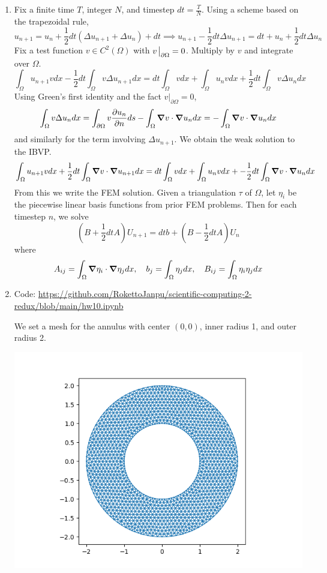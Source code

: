 \documentclass{article}
\newcommand{\br}[1]{\left(#1\right)}
\newcommand{\imp}{\implies}
\newcommand{\ptl}{\partial}
\begin{document}
\begin{enumerate}
\begin{enumerate}
	
	\item Fix a finite time $T$, integer $N$, and timestep $dt=\frac TN$. Using a scheme based on the trapezoidal rule,
	$$u_{n+1} = u_n + \frac12dt(\Delta u_{n+1}+\Delta u_n) + dt
	\imp u_{n+1} - \frac12dt\Delta u_{n+1} = dt + u_n + \frac12dt\Delta u_n$$
	Fix a test function $v\in C^2(\Omega)$ with $v\eval_{\ptl\Omega}=0$. Multiply by $v$ and integrate over $\Omega$.
	$$\int_\Omega u_{n+1}vdx - \frac12dt\int_\Omega v\Delta u_{n+1}dx = dt\int_\Omega vdx + \int_\Omega u_nvdx + \frac12dt\int_\Omega v\Delta u_ndx$$
	Using Green's first identity and the fact $v|_{\ptl\Omega}=0$,
	$$\int_\Omega v\Delta u_ndx = \int_{\ptl\Omega}v\pdv{u_n}{n}ds - \int_\Omega\grad v\cdot\grad u_ndx
	= -\int_\Omega\grad v\cdot\grad u_ndx$$
	and similarly for the term involving $\Delta u_{n+1}$. We obtain the weak solution to the IBVP.
	$$\int_\Omega u_{n+1}vdx + \frac12dt\int_\Omega\grad v\cdot\grad u_{n+1}dx = dt\int_\Omega vdx + \int_\Omega u_nvdx + -\frac12dt\int_\Omega\grad v\cdot\grad u_ndx$$
	From this we write the FEM solution. Given a triangulation $\tau$ of $\Omega$, let $\eta_i$ be the piecewise linear basis functions from prior FEM problems. Then for each timestep $n$, we solve 
	$$\br{B+\frac12dtA}U_{n+1} = dtb + \br{B-\frac12dtA}U_n$$
	where
	$$A_{ij} = \int_\Omega\grad\eta_i\cdot\grad\eta_jdx,
	\quad b_j = \int_\Omega\eta_jdx,
	\quad B_{ij} = \int_\Omega\eta_i\eta_jdx$$
	
	
	\item Code: \url{https://github.com/RokettoJanpu/scientific-computing-2-redux/blob/main/hw10.ipynb}
	
	We set a mesh for the annulus with center $(0,0)$, inner radius 1, and outer radius 2.
	
	\begin{center}
		\includegraphics[scale=.6]{hw10 mesh}
	\end{center}
	

\end{enumerate}
\end{enumerate}
\end{document}
